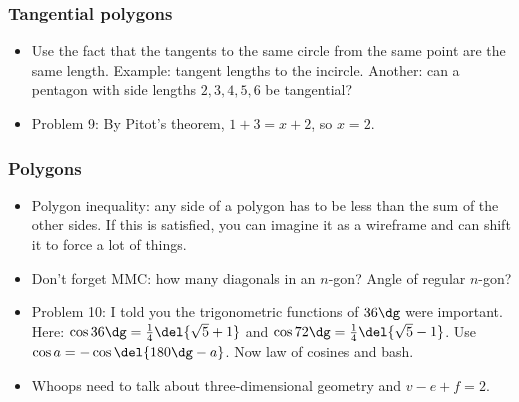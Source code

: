 \documentclass[10pt,paper=letter]{scrartcl}
\begin{document}
\subsubsection*{Tangential polygons}

\begin{itemize}
  \item Use the fact that the tangents to the same circle from the same point are the same length. Example: tangent lengths to the incircle. Another: can a pentagon with side lengths $2, 3, 4, 5, 6$ be tangential?
  \item Problem 9: By Pitot's theorem, $1 + 3 = x + 2$, so $x = 2.$
\end{itemize}

\subsubsection*{Polygons}

\begin{itemize}
  \item Polygon inequality: any side of a polygon has to be less than the sum of the other sides. If this is satisfied, you can imagine it as a wireframe and can shift it to force a lot of things.
  \item Don't forget MMC: how many diagonals in an $n$-gon? Angle of regular $n$-gon?
  \item Problem 10: I told you the trigonometric functions of $36\dg$ were important. Here: $\cos 36\dg = \frac14\del{\sqrt5 + 1}$ and $\cos 72\dg = \frac14\del{\sqrt5 - 1}$. Use $\cos a = - \cos\del{180\dg - a}$. Now law of cosines and bash.
  \item Whoops need to talk about three-dimensional geometry and $v - e + f = 2$.
\end{itemize}
\end{document}
